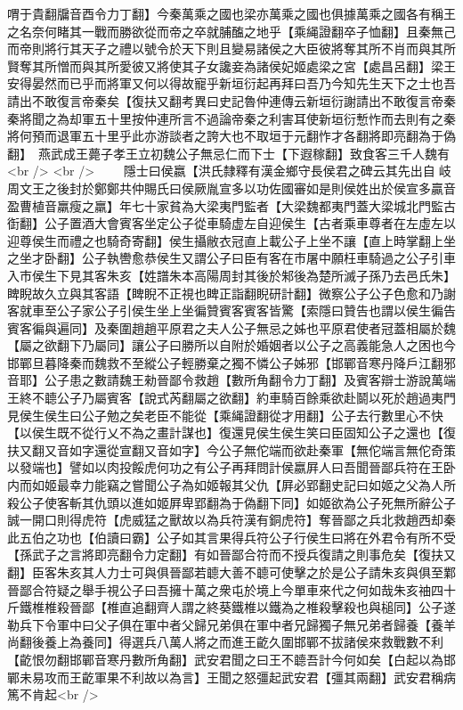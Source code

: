 喟于貴翻牖音酉令力丁翻】今秦萬乘之國也梁亦萬乘之國也俱據萬乘之國各有稱王之名奈何睹其一戰而勝欲從而帝之卒就脯醢之地乎【乘䋲證翻卒子恤翻】且秦無己而帝則將行其天子之禮以號令於天下則且變易諸侯之大臣彼將奪其所不肖而與其所賢奪其所憎而與其所愛彼又將使其子女讒妾為諸侯妃姬處梁之宮【處昌呂翻】梁王安得晏然而已乎而將軍又何以得故寵乎新垣衍起再拜曰吾乃今知先生天下之士也吾請出不敢復言帝秦矣【復扶又翻考異曰史記魯仲連傳云新垣衍謝請出不敢復言帝秦秦將聞之為却軍五十里按仲連所言不過論帝秦之利害耳使新垣衍慙怍而去則有之秦將何預而退軍五十里乎此亦游談者之誇大也不取垣于元翻怍才各翻將即亮翻為于偽翻】　燕武成王薨子孝王立初魏公子無忌仁而下士【下遐稼翻】致食客三千人魏有<br />
<br />
　　隱士曰侯嬴【洪氏隸釋有漢金鄉守長侯君之碑云其先出自岐周文王之後封於鄭鄭共仲賜氏曰侯厥胤宣多以功佐國審如是則侯姓出於侯宣多贏音盈曹植音羸瘦之羸】年七十家貧為大梁夷門監者【大梁魏都夷門蓋大梁城北門監古衘翻】公子置酒大會賓客坐定公子從車騎虚左自迎侯生【古者乘車尊者在左虛左以迎尊侯生而禮之也騎奇寄翻】侯生攝敝衣冠直上載公子上坐不讓【直上時掌翻上坐之坐才卧翻】公子執轡愈恭侯生又謂公子曰臣有客在市屠中願枉車騎過之公子引車入市侯生下見其客朱亥【姓譜朱本高陽周封其後於邾後為楚所滅子孫乃去邑氏朱】睥睨故久立與其客語【睥睨不正視也睥正詣翻睨研計翻】微察公子公子色愈和乃謝客就車至公子家公子引侯生坐上坐徧贊賓客賓客皆驚【索隱曰贊告也謂以侯生徧告賓客徧與遍同】及秦圍趙趙平原君之夫人公子無忌之姊也平原君使者冠蓋相屬於魏【屬之欲翻下乃屬同】讓公子曰勝所以自附於婚姻者以公子之高義能急人之困也今邯鄲旦暮降秦而魏救不至縱公子輕勝棄之獨不憐公子姊邪【邯鄲音寒丹降戶江翻邪音耶】公子患之數請魏王勑晉鄙令救趙【數所角翻令力丁翻】及賓客辯士游說萬端王終不聼公子乃屬賓客【說式芮翻屬之欲翻】約車騎百餘乘欲赴鬬以死於趙過夷門見侯生侯生曰公子勉之矣老臣不能從【乘䋲證翻從才用翻】公子去行數里心不快【以侯生既不從行乂不為之畫計謀也】復還見侯生侯生笑曰臣固知公子之還也【復扶又翻又音如字還從宣翻又音如字】今公子無佗端而欲赴秦軍【無佗端言無佗奇策以發端也】譬如以肉投餒虎何功之有公子再拜問計侯嬴屛人曰吾聞晉鄙兵符在王卧内而如姬最幸力能竊之嘗聞公子為如姬報其父仇【屛必郢翻史記曰如姬之父為人所殺公子使客斬其仇頭以進如姬屛卑郢翻為于偽翻下同】如姬欲為公子死無所辭公子誠一開口則得虎符【虎威猛之獸故以為兵符漢有銅虎符】奪晉鄙之兵北救趙西却秦此五伯之功也【伯讀曰霸】公子如其言果得兵符公子行侯生曰將在外君令有所不受【孫武子之言將即亮翻令力定翻】有如晉鄙合符而不授兵復請之則事危矣【復扶又翻】臣客朱亥其人力士可與俱晉鄙若聼大善不聼可使擊之於是公子請朱亥與俱至鄴晉鄙合符疑之舉手視公子曰吾擁十萬之衆屯於境上今單車來代之何如哉朱亥䄂四十斤鐵椎椎殺晉鄙【椎直追翻齊人謂之終葵鐵椎以鐵為之椎殺擊殺也與槌同】公子遂勒兵下令軍中曰父子俱在軍中者父歸兄弟俱在軍中者兄歸獨子無兄弟者歸養【養羊尚翻後養上為養同】得選兵八萬人將之而進王齕久圍邯鄲不拔諸侯來救戰數不利【齕恨勿翻邯鄲音寒丹數所角翻】武安君聞之曰王不聼吾計今何如矣【白起以為邯鄲未易攻而王齕軍果不利故以為言】王聞之怒彊起武安君【彊其兩翻】武安君稱病篤不肯起<br />
